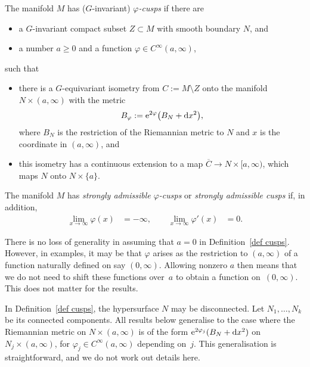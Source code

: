 \documentclass[pdftex]{sigma}%
\numberwithin{equation}{section}
\begin{document}
\begin{Definition}\label{def cusps}
The manifold $M$ has ($G$-invariant) \emph{$\varphi$-cusps} if there are
 \begin{itemize}\itemsep=0pt
 \item a $G$-invariant compact subset $Z \subset M$ with smooth boundary $N$, and
 \item a number $a\geq 0$ and a function $\varphi \in C^{\infty}(a,\infty)$,
 \end{itemize}
 such that
 \begin{itemize}\itemsep=0pt
 \item
 there is a $G$-equivariant isometry from
$C:= {M \setminus Z}$ onto the manifold $N \times (a,\infty)$ with the metric
\begin{equation} \label{eq g phi}
 B_{\varphi} := {\rm e}^{2\varphi}\big(B_N + {\rm d}x^2\big),
\end{equation}
where $B_N$ is the restriction of the Riemannian metric to $N$ and $x$ is the coordinate in $(a,\infty)$, and
\item
this isometry has a continuous extension to a map $\overline{C} \to N \times [a, \infty)$, which maps $N$ onto $N \times \{a\}$.
\end{itemize}
The manifold $M$ has \emph{strongly admissible $\varphi$-cusps} or \emph{strongly admissible cusps} if, in addition,
\begin{equation} \label{eq strong adm}
\begin{split}
\lim_{x \to \infty} \varphi(x) &= -\infty,\qquad
\lim_{x \to \infty} \varphi'(x) &= 0.
\end{split}
\end{equation}
\end{Definition}

\begin{Remark}%
There is no loss of generality in assuming that $a=0$ in Definition~\ref{def cusps}. However, in examples, it may be that $\varphi$ arises as the restriction to $(a, \infty)$ of a function naturally defined on say $(0, \infty)$. Allowing nonzero $a$ then means that we do not need to shift these functions over~$a$ to obtain a function on~$(0, \infty)$. This does not matter for the results.
\end{Remark}

\begin{Remark}In Definition~\ref{def cusps}, the hypersurface $N$ may be disconnected. Let $N_1, \dots, N_k$ be its connected components. All results below generalise to the case where the Riemannian metric on $N \times (a,\infty)$ is of the form ${\rm e}^{2\varphi_j}(B_N + {\rm d}x^2)$ on $N_j \times (a, \infty)$, for $\varphi_j \in C^{\infty}(a,\infty)$ depending on~$j$. This generalisation is straightforward, and we do not work out details here.
\end{Remark}
\end{document}
